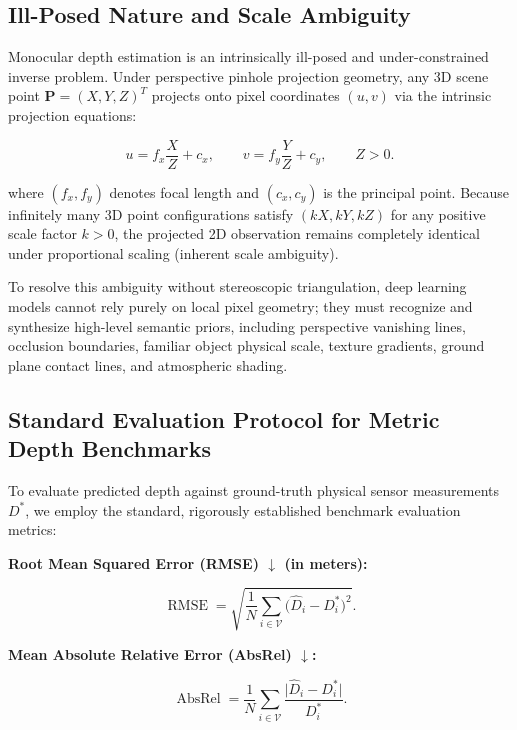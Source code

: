 \documentclass[twoside,final]{hcmut-report}
\begin{document}
\subsection{Ill-Posed Nature and Scale Ambiguity}

Monocular depth estimation is an intrinsically ill-posed and under-constrained inverse problem. Under perspective pinhole projection geometry, any 3D scene point $\mathbf{P} = (X, Y, Z)^T$ projects onto pixel coordinates $(u, v)$ via the intrinsic projection equations:

\begin{equation}
u=f_x\frac{X}{Z}+c_x,
\qquad v=f_y\frac{Y}{Z}+c_y,\qquad Z>0.
\end{equation}

where $(f_x, f_y)$ denotes focal length and $(c_x, c_y)$ is the principal point. Because infinitely many 3D point configurations satisfy $(kX, kY, kZ)$ for any positive scale factor $k > 0$, the projected 2D observation remains completely identical under proportional scaling (inherent scale ambiguity).

To resolve this ambiguity without stereoscopic triangulation, deep learning models cannot rely purely on local pixel geometry; they must recognize and synthesize high-level semantic priors, including perspective vanishing lines, occlusion boundaries, familiar object physical scale, texture gradients, ground plane contact lines, and atmospheric shading.

\subsection{Standard Evaluation Protocol for Metric Depth Benchmarks}

To evaluate predicted depth against ground-truth physical sensor measurements $D^*$, we employ the standard, rigorously established benchmark evaluation metrics:

  \noindent \textbf{Root Mean Squared Error (RMSE) $\downarrow$ (in meters):}

  \begin{equation}
\operatorname{RMSE}
=\sqrt{\frac{1}{N}\sum_{i\in\mathcal{V}}
\bigl(\hat{D}_i-D_i^*\bigr)^2}.
\end{equation}

  \noindent \textbf{Mean Absolute Relative Error (AbsRel) $\downarrow$:}

  \begin{equation}
\operatorname{AbsRel}
=\frac{1}{N}\sum_{i\in\mathcal{V}}
\frac{\lvert\hat{D}_i-D_i^*\rvert}{D_i^*}.
\end{equation}
\end{document}
